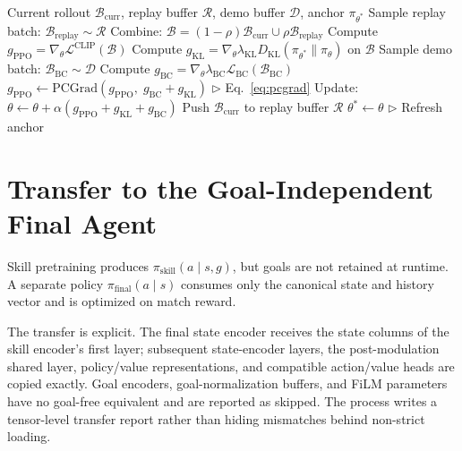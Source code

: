 \documentclass[11pt,a4paper]{article}
\begin{document}
\begin{algorithm}[t]
\caption{Anchored-Replay PPO Update Step}
\label{alg:anchored-ppo}
\begin{algorithmic}[1]
\Require Current rollout $\mathcal{B}_{\text{curr}}$, replay buffer $\mathcal{R}$, demo buffer $\mathcal{D}$, anchor $\pi_{\theta^*}$
\State Sample replay batch: $\mathcal{B}_{\text{replay}} \sim \mathcal{R}$
\State Combine: $\mathcal{B} = (1-\rho) \mathcal{B}_{\text{curr}} \cup \rho \mathcal{B}_{\text{replay}}$
\State Compute $g_{\text{PPO}} = \nabla_\theta \mathcal{L}^{\text{CLIP}}(\mathcal{B})$
\State Compute $g_{\text{KL}} = \nabla_\theta \lambda_{\text{KL}} D_{\text{KL}}(\pi_{\theta^*} \| \pi_\theta)$ on $\mathcal{B}$
\State Sample demo batch: $\mathcal{B}_{\text{BC}} \sim \mathcal{D}$
\State Compute $g_{\text{BC}} = \nabla_\theta \lambda_{\text{BC}} \mathcal{L}_{\text{BC}}(\mathcal{B}_{\text{BC}})$
    \State $g_{\text{PPO}} \leftarrow \text{PCGrad}(g_{\text{PPO}},\; g_{\text{BC}} + g_{\text{KL}})$ \hfill $\triangleright$ Eq.~\ref{eq:pcgrad}
\EndIf
\State Update: $\theta \leftarrow \theta + \alpha(g_{\text{PPO}} + g_{\text{KL}} + g_{\text{BC}})$
\State Push $\mathcal{B}_{\text{curr}}$ to replay buffer $\mathcal{R}$
    \State $\theta^* \leftarrow \theta$ \hfill $\triangleright$ Refresh anchor
\EndIf
\end{algorithmic}
\end{algorithm}

\section{Transfer to the Goal-Independent Final Agent}
\label{sec:final-transfer}

Skill pretraining produces $\pi_{\mathrm{skill}}(a\mid s,g)$, but goals are not retained at runtime. A separate policy $\pi_{\mathrm{final}}(a\mid s)$ consumes only the canonical state and history vector and is optimized on match reward.

The transfer is explicit. The final state encoder receives the state columns of the skill encoder's first layer; subsequent state-encoder layers, the post-modulation shared layer, policy/value representations, and compatible action/value heads are copied exactly. Goal encoders, goal-normalization buffers, and FiLM parameters have no goal-free equivalent and are reported as skipped. The process writes a tensor-level transfer report rather than hiding mismatches behind non-strict loading.
\end{document}
